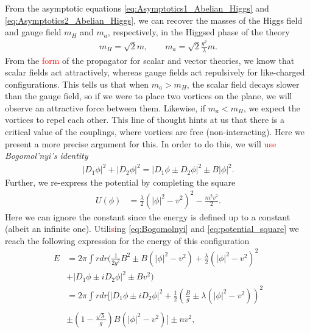     From the asymptotic equations \eqref{eq:Asymptotics1_Abelian_Higgs} and \eqref{eq:Asymptotics2_Abelian_Higgs}, we can recover the masses of the Higgs field and gauge field $m_{H}$ and $m_a$, respectively, in the Higgsed phase of the theory 
    \begin{align}
        m_{H}= \sqrt{2} m, \qquad m_a = \sqrt{2} \frac{g^2}{\lambda}m .
    \end{align}
    From the \textcolor{red}{form} of the propagator for scalar and vector theories, we know that scalar fields act attractively, whereas gauge fields act repulsively for like-charged configurations. This tells us that when $m_a>m_H$, the scalar field decays slower than the gauge field, so if we were to place two vortices on the plane, we will observe an attractive force between them. Likewise, if  $m_a<m_H$, we expect the vortices to repel each other. This line of thought hints at us that there is a critical value of the couplings, where vortices are free (non-interacting). Here we present a more precise argument for this. In order to do this, we will \textcolor{red}{use} \textit{Bogomol'nyi's identity}
    \begin{align}
        |D_1 \phi|^2 + |D_2 \phi|^2 = |D_1 \phi \pm D_2 \phi|^2 \pm B |\phi|^2. \label{eq:Bogomolnyi}
    \end{align}
    Further, we re-express the potential by completing the square
    \begin{align}
        U(\phi)&=\frac{\lambda}{2} \left( |\phi|^2 - v^2 \right)^2 - \frac{m^2 v^2}{2}. \label{eq:potential_square}
    \end{align}
    Here we can ignore the constant since the energy is defined up to a constant (albeit an infinite one). Utili\textcolor{red}{s}ing \eqref{eq:Bogomolnyi} and \eqref{eq:potential_square} we reach the following expression for the energy of this configuration
    \begin{align}
        E &= 2 \pi \int r dr \bigg(\frac{1}{2 g^2}B^2 \pm B(|\phi|^2 -v^2) + \frac{\lambda}{2} \left(|\phi|^2 -v^2 \right)^2 \\ \nonumber 
        &+ |D_1\phi \pm i D_2 \phi|^2 \pm B v^2 \bigg) \\ \nonumber
        &= 2 \pi \int r dr \bigg[|D_1\phi \pm i D_2 \phi|^2 +\frac{1}{2}\left( \frac{B}{g} \pm \lambda \left(|\phi|^2 -v^2  \right) \right)^2   \\ \nonumber \\
        &\pm \left(1 - \frac{\sqrt{\lambda}}{g} \right) B \left(|\phi|^2 - v^2 \right) \bigg] \pm n v^2,
    \end{align}
